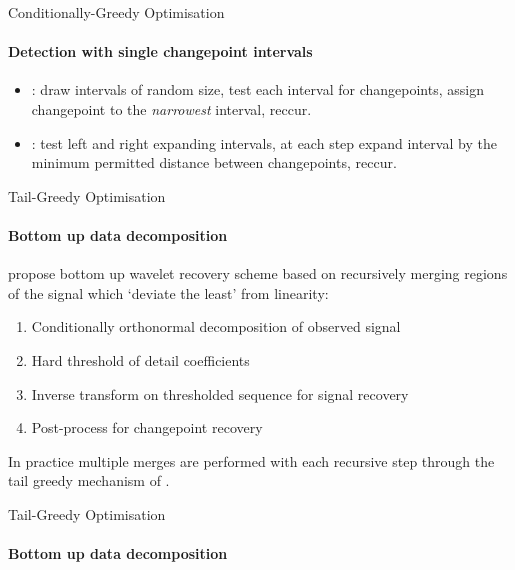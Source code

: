 \documentclass{beamer}
\begin{document}

\begin{frame}{Conditionally-Greedy Optimisation}
\framesubtitle{Detection with single changepoint intervals}

\begin{itemize}
    \item \cite{baranowski2019narrowest}: draw intervals of random size, test each interval for changepoints, assign changepoint to the \textit{narrowest} interval, reccur. 
    \bigskip
    \item \cite{anastasiou2019detecting}: test left and right expanding intervals, at each step expand interval by the minimum permitted distance between changepoints, reccur.
\end{itemize}
    
\end{frame}




\begin{frame}{Tail-Greedy Optimisation}
\framesubtitle{Bottom up data decomposition}

\cite{maeng2019detecting} propose bottom up wavelet recovery scheme based on recursively merging regions of the signal which `deviate the least' from linearity: 

\bigskip

\begin{enumerate}
    \item Conditionally orthonormal decomposition of observed signal
    \item Hard threshold of detail coefficients 
    \item Inverse transform on thresholded sequence for signal recovery 
    \item Post-process for changepoint recovery
\end{enumerate}

\bigskip

In practice multiple merges are performed with each recursive step through the tail greedy mechanism of \cite{fryzlewicz2018tail}.
\end{frame}




\begin{frame}{Tail-Greedy Optimisation}
\framesubtitle{Bottom up data decomposition}

\begin{figure}[h]
	\centering
\end{figure}

\end{frame}
\end{document}

